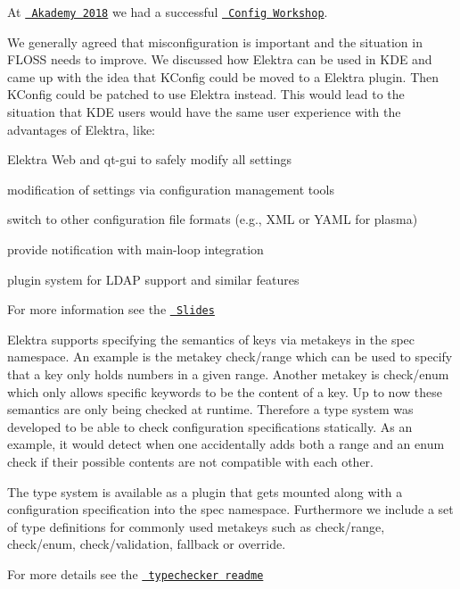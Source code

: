 At \href{https://akademy.kde.org/2018}{\texttt{ Akademy 2018}} we had a successful \href{https://community.kde.org/Akademy/2018/Config_Workshop}{\texttt{ Config Workshop}}.

We generally agreed that misconfiguration is important and the situation in F\+L\+O\+SS needs to improve. We discussed how Elektra can be used in K\+DE and came up with the idea that K\+Config could be moved to a Elektra plugin. Then K\+Config could be patched to use Elektra instead. This would lead to the situation that K\+DE users would have the same user experience with the advantages of Elektra, like\+:


\begin{DoxyItemize}
\item Elektra Web and qt-\/gui to safely modify all settings
\item modification of settings via configuration management tools
\item switch to other configuration file formats (e.\+g., X\+ML or Y\+A\+ML for plasma)
\item provide notification with main-\/loop integration
\item plugin system for L\+D\+AP support and similar features
\end{DoxyItemize}

For more information see the \href{http://www.complang.tuwien.ac.at/raab/akademy.pdf}{\texttt{ Slides}}

Elektra supports specifying the semantics of keys via metakeys in the {\ttfamily spec} namespace. An example is the metakey {\ttfamily check/range} which can be used to specify that a key only holds numbers in a given range. Another metakey is {\ttfamily check/enum} which only allows specific keywords to be the content of a key. Up to now these semantics are only being checked at runtime. Therefore a type system was developed to be able to check configuration specifications statically. As an example, it would detect when one accidentally adds both a range and an enum check if their possible contents are not compatible with each other.

The type system is available as a plugin that gets mounted along with a configuration specification into the spec namespace. Furthermore we include a set of type definitions for commonly used metakeys such as {\ttfamily check/range}, {\ttfamily check/enum}, {\ttfamily check/validation}, {\ttfamily fallback} or {\ttfamily override}.

For more details see the \href{https://www.libelektra.org/plugins/typechecker}{\texttt{ typechecker readme}}

